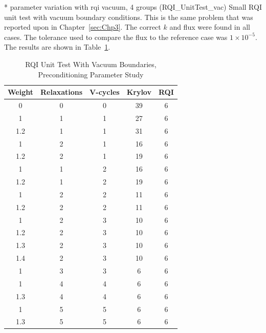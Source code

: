 * parameter variation with rqi vacuum, 4 groups (RQI\_UnitTest\_vac)
Small RQI unit test with vacuum boundary conditions. This is the same problem that was reported upon in Chapter~\ref{sec:Chp3}. The correct $k$ and flux were found in all cases. The tolerance used to compare the flux to the reference case was $1 \times 10^{-5}$. The results are shown in Table~\ref{table:RQIUnitTestVac}.
%
\begin{table}[!h]
\caption{RQI Unit Test With Vacuum Boundaries, Preconditioning Parameter Study}
\begin{center}
\begin{tabular}{c c c c c}
\hline
Weight & Relaxations & V-cycles & Krylov & RQI \\[0.5ex]
\hline
0    & 0 & 0 & 39 & 6 \\
1    & 1 & 1 & 27 & 6 \\
1.2 & 1 & 1 & 31 & 6 \\
1    & 2 & 1 & 16 & 6 \\
1.2 & 2 & 1 & 19 & 6 \\
1    & 1 & 2 & 16 & 6 \\
1.2 & 1 & 2 & 19 & 6 \\
1    & 2 & 2 & 11 & 6 \\
1.2 & 2 & 2 & 11 & 6 \\
\hline
1    & 2 & 3 & 10 & 6 \\
1.2 & 2 & 3 & 10 & 6 \\
1.3 & 2 & 3 & 10 & 6 \\
1.4 & 2 & 3 & 10 & 6 \\
\hline
1    & 3 & 3 & 6   & 6 \\
1    & 4 & 4 & 6   & 6 \\
1.3 & 4 & 4 & 6   & 6 \\
1    & 5 & 5 & 6   & 6 \\
1.3 & 5 & 5 & 6   & 6 \\
\hline 
\end{tabular}
\end{center}
\label{table:RQIUnitTestVac}
\end{table}

